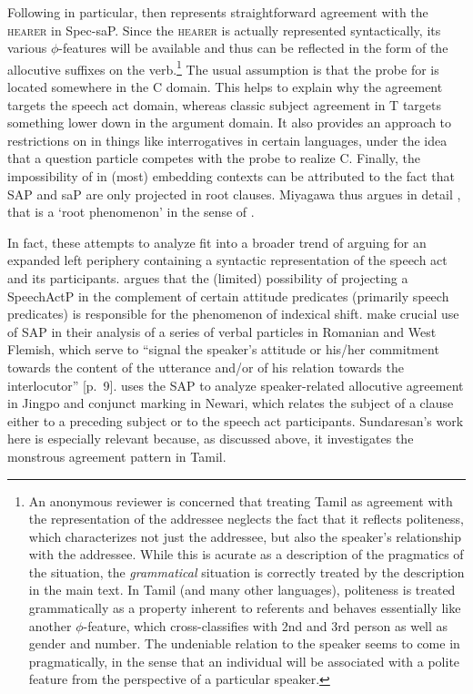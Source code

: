 \documentclass[output=paper, modfonts, nonflat]{langsci/langscibook}
\begin{document}
\noindent Following \citet{miyagawa:2017} in particular, \allagr{} then
represents straightforward agreement with the \textsc{hearer} in
Spec-saP. Since the \textsc{hearer} is actually represented
syntactically, its various $\phi$-features will be available and thus
can be reflected in the form of the allocutive suffixes on the
verb.\footnote{An anonymous reviewer is concerned that treating Tamil
  \allagr{} as agreement with the representation of the addressee
  neglects the fact that it reflects politeness, which characterizes
  not just the addressee, but also the speaker's relationship with the
  addressee. While this is acurate as a description of the pragmatics
  of the situation, the \emph{grammatical} situation is correctly
  treated by the description in the main text. In Tamil (and many
  other languages), politeness is treated grammatically as a property
  inherent to referents and behaves essentially like another
  $\phi$-feature, which cross-classifies with 2nd and 3rd person as
  well as gender and number. The undeniable relation to the speaker
  seems to come in pragmatically, in the sense that an individual will
  be associated with a polite feature from the perspective of a
  particular speaker.}  The usual assumption is that the probe for
\allagr{} is located somewhere in the C domain. This helps to explain
why the agreement targets the speech act domain, whereas classic
subject agreement in T targets something lower down in the argument
domain. It also provides an approach to restrictions on \allagr{} in
things like interrogatives in certain languages, under the idea that a
question particle competes with the \allagr{} probe to realize
C. Finally, the impossibility of \allagr{} in (most) embedding
contexts can be attributed to the fact that SAP and saP are only
projected in root clauses. Miyagawa thus argues in detail \citep[see
especially][]{miyagawa:2012}, that \allagr{} is a `root phenomenon' in
the sense of \citep{emonds:1970}.

In fact, these attempts to analyze \allagr{} fit into a broader trend
of arguing for an expanded left periphery containing a syntactic
representation of the speech act and its
participants. \citet{sundaresan:diss} argues that the (limited)
possibility of projecting a SpeechActP in the complement of certain
attitude predicates (primarily speech predicates) is responsible for
the phenomenon of indexical shift. \citet{haegemanhill:2011} make
crucial use of SAP in their analysis of a series of verbal particles
in Romanian and West Flemish, which serve to ``signal the speaker's
attitude or his/her commitment towards the content of the utterance
and/or of his relation towards the interlocutor'' [p.\
9]. \citet{zu:2015} uses the SAP to analyze speaker-related allocutive
agreement in Jingpo and conjunct marking in Newari, which relates the
subject of a clause either to a preceding subject or to the speech act
participants.  Sundaresan's work here is especially relevant because,
as discussed above, it investigates the monstrous agreement pattern in
Tamil.
\end{document}

